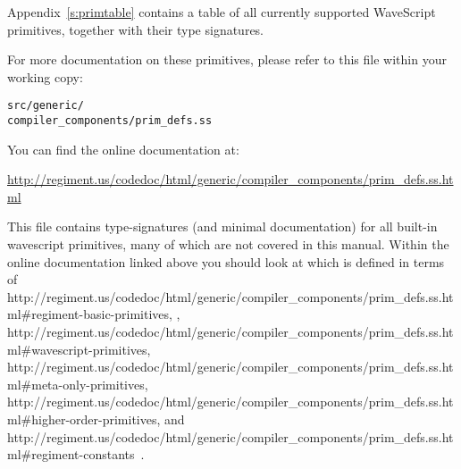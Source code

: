 \documentclass[twocolumn]{report}
\newcommand{\ws}{WaveScript}
\begin{document}
Appendix~\ref{s:primtable} contains a table of all currently supported
{\ws} primitives, together with their type signatures.

For more documentation on these primitives, please refer to this file
within your working copy:
\vspace{-2mm}
\begin{center}
{\tt{src/generic/\\compiler\_components/prim\_defs.ss}}
\end{center}

You can find the online documentation at:
\vspace{-2mm}
\begin{center}
\url{http://regiment.us/codedoc/html/generic/compiler\_components/prim\_defs.ss.html}
\end{center}




This file contains type-signatures (and minimal documentation) for all built-in
wavescript primitives, many of which are not covered in this manual.
Within the online documentation linked above you should look at 
which is defined in terms of 
      {http://regiment.us/codedoc/html/generic/compiler\_components/prim\_defs.ss.html\#regiment-basic-primitives},
,
          {http://regiment.us/codedoc/html/generic/compiler\_components/prim\_defs.ss.html\#wavescript-primitives},
           {http://regiment.us/codedoc/html/generic/compiler\_components/prim\_defs.ss.html\#meta-only-primitives},
        {http://regiment.us/codedoc/html/generic/compiler\_components/prim\_defs.ss.html\#higher-order-primitives},
and
             {http://regiment.us/codedoc/html/generic/compiler\_components/prim\_defs.ss.html\#regiment-constants}~.
\end{document}
